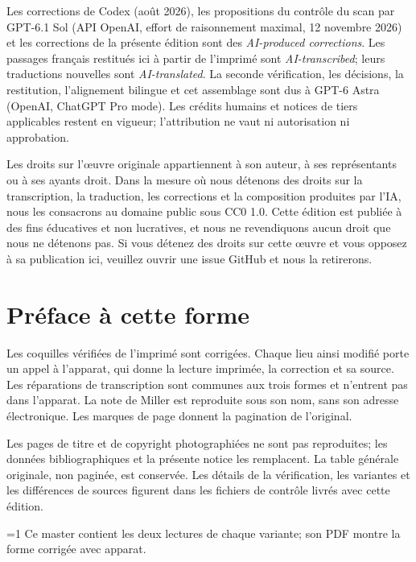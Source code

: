 \documentclass[oneside]{book}
\theoremstyle{sga-source}
\theoremstyle{sga-source-dash}
\theoremstyle{sga-source-dotdash}
\theoremstyle{sga-source-number-note-dash}
\theoremstyle{sga-source-note-number-dotdash}
\theoremstyle{sga-source-example-dotdash}
\theoremstyle{sga-source-inline-number}
\theoremstyle{sga-source-bare-number}
\theoremstyle{sga-source}
\providecommand\EditionIsMaster{0}
\begin{document}
\medskip
Les corrections de Codex (août 2026), les propositions du contrôle du scan
par GPT-6.1 Sol (API OpenAI, effort de raisonnement maximal, 12 novembre
2026) et les corrections de la présente édition sont des
\emph{AI-produced corrections}. Les passages français restitués ici à
partir de l’imprimé sont \emph{AI-transcribed}; leurs traductions nouvelles
sont \emph{AI-translated}. La seconde vérification, les décisions, la
restitution, l’alignement bilingue et cet assemblage sont dus à GPT-6 Astra
(OpenAI, ChatGPT Pro mode). Les crédits humains et notices de tiers
applicables restent en vigueur; l’attribution ne vaut ni autorisation ni
approbation.

\medskip
Les droits sur l'œuvre originale appartiennent à son auteur, à ses représentants ou à ses ayants
droit. Dans la mesure où nous détenons des droits sur la transcription, la traduction, les corrections et la
composition produites par l'IA, nous les consacrons au domaine public sous CC0 1.0. Cette édition est publiée
à des fins éducatives et non lucratives, et nous ne revendiquons aucun droit que nous ne détenons pas. Si vous
détenez des droits sur cette œuvre et vous opposez à sa publication ici, veuillez ouvrir une issue GitHub et
nous la retirerons.

\chapter*{Préface à cette forme}
Les coquilles vérifiées de l’imprimé sont corrigées. Chaque lieu
ainsi modifié porte un appel à l’apparat, qui donne la lecture imprimée,
la correction et sa source. Les réparations de transcription sont communes
aux trois formes et n’entrent pas dans l’apparat. La note de Miller est
reproduite sous son nom, sans son adresse électronique. Les marques de
page donnent la pagination de l’original.

Les pages de titre et de copyright photographiées ne sont pas reproduites;
les données bibliographiques et la présente notice les remplacent. La
table générale originale, non paginée, est conservée. Les détails de la
vérification, les variantes et les différences de sources figurent dans
les fichiers de contrôle livrés avec cette édition.

\ifnum\EditionIsMaster=1\relax
Ce master contient les deux lectures de chaque variante; son PDF montre la forme corrigée avec apparat.
\fi

\clearpage

\or
\end{document}
